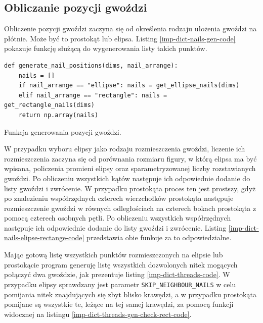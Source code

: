         \subsection{Obliczanie pozycji gwoździ} \label{imp-dict-nails}
        Obliczenie pozycji gwoździ zaczyna się od określenia rodzaju ułożenia gwoździ na płótnie. Może być to prostokąt lub elipsa. Listing \ref{imp-dict-nails-gen-code} pokazuje funkcję służącą do wygenerowania listy takich punktów.
        \begin{code}[H]
        \begin{verbatim}
def generate_nail_positions(dims, nail_arrange):
    nails = []
    if nail_arrange == "ellipse": nails = get_ellipse_nails(dims)
    elif nail_arrange == "rectangle": nails = get_rectangle_nails(dims)
    return np.array(nails)
        \end{verbatim}
        \caption{Funkcja generowania pozycji gwoździ.}
        \label{imp-dict-nails-gen-code}
        \end{code}
        
        W przypadku wyboru elipsy jako rodzaju rozmieszczenia gwoździ, liczenie ich rozmieszczenia zaczyna się od porównania rozmiaru figury, w którą elipsa ma być wpisana, policzenia promieni elipsy oraz sparametryzowanej liczby rozstawianych gwoździ. Po obliczeniu wszystkich kątów następuje ich odpowiednie dodanie do listy gwoździ i zwrócenie. W przypadku prostokąta proces ten jest prostszy, gdyż po znalezieniu współrzędnych czterech wierzchołków prostokąta następuje rozmieszczenie gwoździ w równych odległościach na czterech bokach prostokąta z pomocą czterech osobnych pętli. Po obliczeniu wszystkich współrzędnych następuje ich odpowiednie dodanie do listy gwoździ i zwrócenie. Listing \ref{imp-dict-nails-elipse-rectange-code} przedstawia obie funkcje za to odpowiedzialne.
        
        Mając gotową listę wszystkich punktów rozmieszczonych na elipsie lub prostokącie program generuję listę wszystkich dozwolonych nitek mogących połączyć dwa gwoździe, jak prezentuje listing \ref{imp-dict-threads-code}. W przypadku elipsy sprawdzany jest parametr \texttt{SKIP_NEIGHBOUR_NAILS} w celu pomijania nitek znajdujących się zbyt blisko krawędzi, a w przypadku prostokąta pomijane są wszystkie te, leżące na tej samej krawędzi, za pomocą funkcji widocznej na listingu \ref{imp-dict-threads-gen-check-rect-code}. 
        
